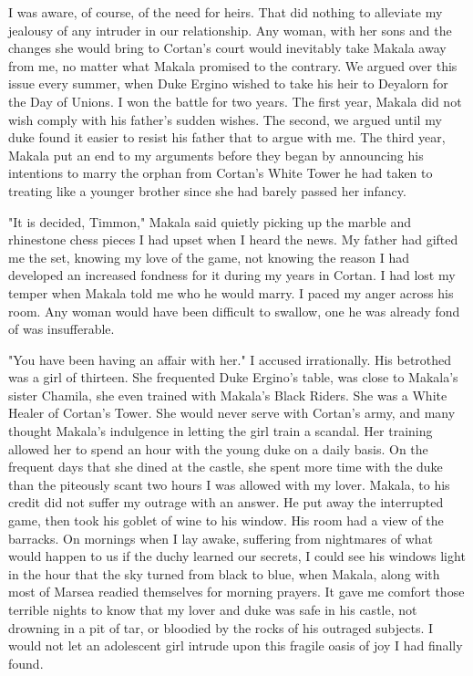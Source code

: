 \documentclass{article}
\begin{document}
I was aware, of course, of the need for heirs. That did nothing to alleviate my jealousy of any intruder in our relationship. Any woman, with her sons and the changes she would bring to Cortan's court would inevitably take Makala away from me, no matter what Makala promised to the contrary. We argued over this issue every summer, when Duke Ergino wished to take his heir to Deyalorn for the Day of Unions. I won the battle for two years. The first year, Makala did not wish comply with his father's sudden wishes. The second, we argued until my duke found it easier to resist his father that to argue with me. The third year, Makala put an end to my arguments before they began by announcing his intentions to marry the orphan from Cortan's White Tower he had taken to treating like a younger brother since she had barely passed her infancy. 

"It is decided, Timmon," Makala said quietly picking up the marble and rhinestone chess pieces I had upset when I heard the news. My father had gifted me the set, knowing my love of the game, not knowing the reason I had developed an increased fondness for it during my years in Cortan. I had lost my temper when Makala told me who he would marry. I paced my anger across his room. Any woman would have been difficult to swallow, one he was already fond of was insufferable.

"You have been having an affair with her." I accused irrationally. His betrothed was a girl of thirteen. She frequented Duke Ergino's table, was close to Makala's sister Chamila, she even trained with Makala's Black Riders. She was a White Healer of Cortan's Tower. She would never serve with Cortan's army, and many thought Makala's indulgence in letting the girl train a scandal. Her training allowed her to spend an hour with the young duke on a daily basis. On the frequent days that she dined at the castle, she spent more time with the duke than the piteously scant two hours I was allowed with my lover. 
Makala, to his credit did not suffer my outrage with an answer. He put away the interrupted game, then took his goblet of wine to his window. His room had a view of the barracks. On mornings when I lay awake, suffering from nightmares of what would happen to us if the duchy learned our secrets, I could see his windows light in the hour that the sky turned from black to blue, when Makala, along with most of Marsea readied themselves for morning prayers. It gave me comfort those terrible nights to know that my lover and duke was safe in his castle, not drowning in a pit of tar, or bloodied by the rocks of his outraged subjects. I would not let an adolescent girl intrude upon this fragile oasis of joy I had finally found. 
\end{document}

